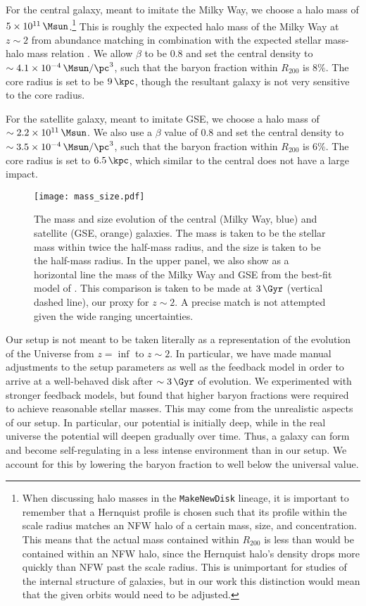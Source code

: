 For the central galaxy, meant to imitate the Milky Way, we choose a halo mass of $5\times10^{11}\,\Msun$.\footnote{When discussing halo masses in the \texttt{MakeNewDisk} lineage, it is important to remember that a Hernquist profile is chosen such that its profile within the scale radius matches an NFW halo of a certain mass, size, and concentration. This means that the actual mass contained within $R_{200}$ is less than would be contained within an NFW halo, since the Hernquist halo's density drops more quickly than NFW past the scale radius. This is unimportant for studies of the internal structure of galaxies, but in our work this distinction would mean that the given orbits would need to be adjusted.} This is roughly the expected halo mass of the Milky Way at $z\sim2$ from abundance matching in combination with the expected stellar mass-halo mass relation . We allow $\beta$ to be $0.8$ and set the central density to $\sim4.1\times10^{-4}\,\Msun/\pc^3$, such that the baryon fraction within $R_{200}$ is $8\%$. The core radius is set to be $9\,\kpc$, though the resultant galaxy is not very sensitive to the core radius.

For the satellite galaxy, meant to imitate GSE, we choose a halo mass of $\sim2.2\times10^{11}\,\Msun$. We also use a $\beta$ value of $0.8$ and set the central density to $\sim3.5\times10^{-4}\,\Msun/\pc^3$, such that the baryon fraction within $R_{200}$ is $6\%$. The core radius is set to $6.5\,\kpc$, which similar to the central does not have a large impact.

\begin{figure}
  \centering
  \texttt{[image: mass\_size.pdf]}
  \caption{The mass and size evolution of the central (Milky Way, blue) and satellite (GSE, orange) galaxies. The mass is taken to be the stellar mass within twice the half-mass radius, and the size is taken to be the half-mass radius. In the upper panel, we also show as a horizontal line the mass of the Milky Way and GSE from the best-fit model of \citet{2021ApJ...923...92N}. This comparison is taken to be made at $3\,\Gyr$ (vertical dashed line), our proxy for $z\sim2$. A precise match is not attempted given the wide ranging uncertainties.}
  \label{fig:mass_size}
\end{figure}

Our setup is not meant to be taken literally as a representation of the evolution of the Universe from $z=\inf$ to $z\sim2$. In particular, we have made manual adjustments to the setup parameters as well as the feedback model in order to arrive at a well-behaved disk after $\sim3\,\Gyr$ of evolution. We experimented with stronger feedback models, but found that higher baryon fractions were required to achieve reasonable stellar masses. This may come from the unrealistic aspects of our setup. In particular, our potential is initially deep, while in the real universe the potential will deepen gradually over time. Thus, a galaxy can form and become self-regulating in a less intense environment than in our setup. We account for this by lowering the baryon fraction to well below the universal value.

